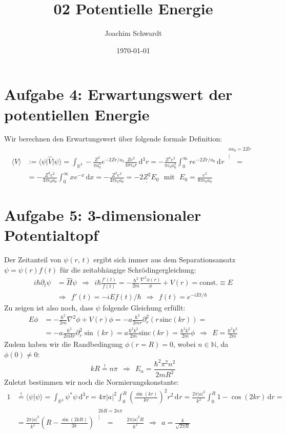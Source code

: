 \documentclass[a4paper,12pt]{article}
\newcommand{\bra}{}
\newcommand{\kom}{}
\newcommand{\brak}{}
\newcommand{\braket}{}
\newcommand{\intx}{}
\begin{document}
\title{02 Potentielle Energie}
\author{Joachim Schwardt}
\date{\today}
\maketitle

\section*{Aufgabe 4: Erwartungswert der potentiellen Energie}
Wir berechnen den Erwartungswert über folgende formale Definition:
\begin{align*}\bra\langle {V}\rangle &:=\braket\langle {\psi} \vert {\hat{V}}\vert {\psi} \rangle = \intx\int_{\mathbb{R}^{3}} -{\frac{Z^3}{\pi a_0^3}e^{-2Zr/a_0}}\frac{Ze^2}{4\pi\epsilon_0 r}\,\mathrm{d}^{3}r= -\frac{Z^4e^2}{\pi\epsilon_0 a_0^3}\intx\int_{0}^\infty {re^{-2Zr/a_0}}\,\mathrm{d}^{ }r\kom\overset{\substack{ {xa_0=2Zr} \\|}}{=}\\
&= -\frac{Z^2e^2}{4\pi\epsilon_0 a_0}\int_0^\infty xe^{-x}\,\mathrm{d}x=-\frac{Z^2e^2}{4\pi\epsilon_0 a_0}=\underline{-2Z^2E_0}\ \ \ \mathrm{mit }\ \ \ E_0=\frac{e^2}{8\pi\epsilon_0 a_0}
\end{align*}
\section*{Aufgabe 5: 3-dimensionaler Potentialtopf}
Der Zeitanteil von $\psi (r,\, t)$ ergibt sich immer aus dem Separationsansatz $\psi = \psi (r)f(t)$ für die zeitabhängige Schrödingergleichung:
\begin{align*}
i\hbar\partial_t\psi&=\hat{H}\psi\ \ \Rightarrow\ \ i\hbar\frac{f'(t)}{f(t)}=-\frac{\hbar^2}{2m}\frac{\nabla^2\phi (r)}{\phi}+V(r)=\mathrm{const.}\equiv E\\
&\Rightarrow\ \ f'(t)=-iEf(t)/\hbar\ \ \Rightarrow\ \ f(t)=e^{-iEt/\hbar} 
\end{align*}
Zu zeigen ist also noch, dass $\psi$ folgende Gleichung erfüllt:
\begin{align*}
E\phi &= -\frac{\hbar^2}{2m}\nabla^2\phi +V(r)\phi = -a\frac{\hbar^2}{2mr}\partial_r^2(r\,\mathrm{sinc}(kr))=\\
&=-a\frac{\hbar^2}{2mkr}\partial_r^2\sin (kr)=a\frac{\hbar^2k^2}{2m}\mathrm{sinc} (kr)=\frac{\hbar^2k^2}{2m}\phi\ \ \Rightarrow\ \ E=\frac{\hbar^2k^2}{2m}
\end{align*}
Zudem haben wir die Randbedingung $\phi (r=R)=0$, wobei $n\in\mathbb{N}$, da $\phi (0)\neq 0$:
$$kR\overset {!}{=}n\pi\ \ \Rightarrow\ \ E_n=\frac{\hbar^2\pi^2n^2}{2mR^2}$$
Zuletzt bestimmen wir noch die Normierungskonstante:
\begin{align*}
1&\overset {!}{=}\brak\langle {\psi} \vert {\psi} \rangle =\intx\int_{\mathbb{R}^{3}} {\psi^\ast\psi}\,\mathrm{d}^{3}r=4\pi |a|^2\intx\int_{0}^R {\left(\frac{\sin (kr)}{kr}\right)^2}r^2\,\mathrm{d}^{ }r=\frac{2\pi |a|^2}{k^2}\int_0^R 1-\cos(2kr)\,\mathrm{d}r=\\
&=\frac{2\pi |a|^2}{k^2}\left(R-\frac{\sin(2kR)}{2k}\right)\kom\overset{\substack{ {2kR=2n\pi} \\|}}{=}\frac{2\pi|a|^2R}{k^2}\ \ \Rightarrow\ \ a=\frac{k}{\sqrt{2\pi R}}
\end{align*}
\end{document}

